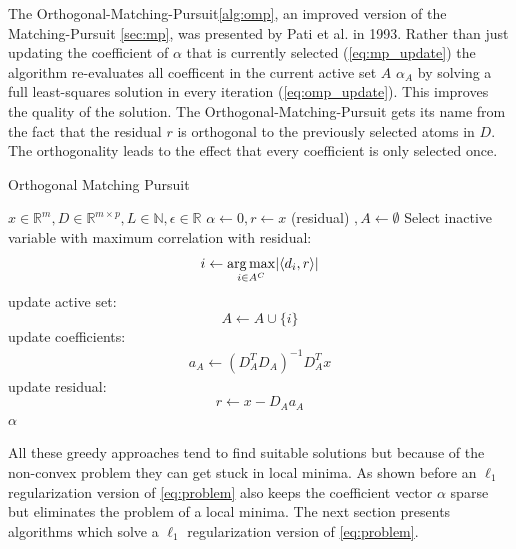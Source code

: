 The Orthogonal-Matching-Pursuit\ref{alg:omp}, an improved version of
the Matching-Pursuit \ref{sec:mp}, was presented by Pati et al.
in 1993\cite{Pati1993}. Rather than just updating the coefficient of $\alpha$
that is currently selected (\ref{eq:mp_update}) the algorithm re-evaluates
all coefficent in the current active set $A$ 
$\alpha_A$ by solving a full least-squares solution in every iteration
(\ref{eq:omp_update}). This improves the quality of the
solution.\cite{Pati1993} The Orthogonal-Matching-Pursuit gets its name from
the fact that the residual $r$ is orthogonal to the previously selected atoms in
$D$. The orthogonality leads to the effect that every coefficient is only
selected
once.
\begin{algorithm}
\caption{Orthogonal Matching Pursuit}
\label{alg:omp}
\begin{algorithmic}[1]
\REQUIRE $x \in \mathbb{R}^m, D \in \mathbb{R}^{m\times p}, L \in \mathbb{N},
\epsilon \in \mathbb{R}$
\STATE $\alpha \gets 0, r \gets x $ (residual) $, A \gets \emptyset$
\STATE Select inactive variable with maximum correlation with residual: 
\begin{equation*}
i \gets \operatorname*{arg\,max}_{i \in A^C} \lvert \left<d_i,r\right> \rvert
\end{equation*}
\STATE update active set:
\begin{equation*}
 A \gets A \cup \{i\} 
\end{equation*}
\STATE update coefficients: 
\begin{align}
a_A \gets \left( D_A^T D_A \right)^{-1} D_A^T x  \label{eq:omp_update}
\end{align}
\STATE update residual:
\begin{equation*}
 r \gets x-D_Aa_A
\end{equation*}
\ENDFOR
\RETURN $\alpha$
\end{algorithmic}
\end{algorithm}


All these greedy approaches tend to find suitable solutions but because of the
non-convex problem they can get stuck in local minima. As shown before an
$\ell_1$ regularization version of \ref{eq:problem} also keeps the coefficient
vector $\alpha$ sparse but eliminates the problem of a local minima. The next
section presents algorithms which solve  a $\ell_1$ regularization version of
\ref{eq:problem}.



